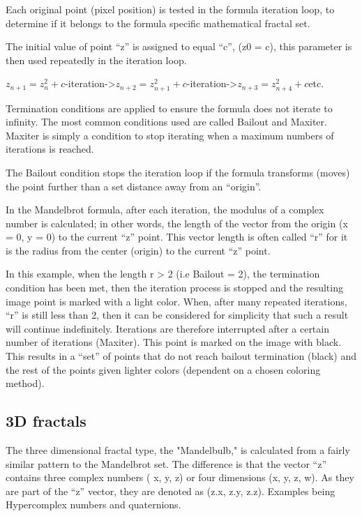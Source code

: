 Each original point (pixel position) is tested in the formula iteration
loop, to determine if it belongs to the formula specific mathematical
fractal set.

The initial value of point ``z'' is assigned to equal ``c'', (z0 = c),
this parameter is then used repeatedly in the iteration loop.

\(z_{n + 1} = z_{n}^{2} + c\)-iteration-\textgreater{}\(z_{n + 2} = z_{n + 1}^{2} + c\)-iteration-\textgreater{}\(z_{n + 3} = z_{n + 4}^{2} + c\)etc.

Termination conditions are applied to ensure the formula does not
iterate to infinity. The most common conditions used are called Bailout
and Maxiter. Maxiter is simply a condition to stop iterating when a
maximum numbers of iterations is reached.

The Bailout condition stops the iteration loop if the formula transforms
(moves) the point further than a set distance away from an ``origin''.

In the Mandelbrot formula, after each iteration, the modulus of a
complex number is calculated; in other words, the length of the vector
from the origin (x = 0, y = 0) to the current ``z'' point. This vector
length is often called ``r'' for it is the radius from the center
(origin) to the current ``z'' point.

In this example, when the length r \textgreater{} 2 (i.e Bailout = 2),
the termination condition has been met, then the iteration process is
stopped and the resulting image point is marked with a light color.
When, after many repeated iterations, ``r'' is still less than 2, then
it can be considered for simplicity that such a result will continue
indefinitely. Iterations are therefore interrupted after a certain
number of iterations (Maxiter). This point is marked on the image with
black. This results in a ``set'' of points that do not reach bailout
termination (black) and the rest of the points given lighter colors
(dependent on a chosen coloring method).

\subsection{3D fractals}\label{d-fractals}

The three dimensional fractal type, the "Mandelbulb," is calculated from
a fairly similar pattern to the Mandelbrot set. The difference is that
the vector ``z'' contains three complex numbers ( x, y, z) or four
dimensions (x, y, z, w). As they are part of the ``z'' vector, they are
denoted as (z.x, z.y, z.z). Examples being Hypercomplex numbers and
quaternions.

